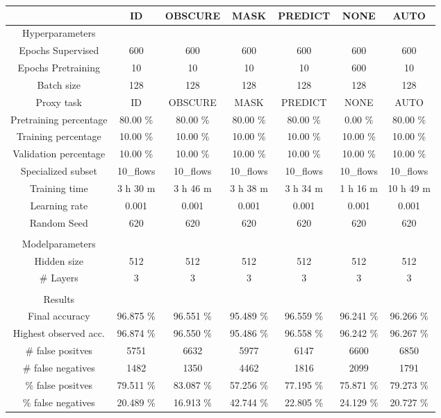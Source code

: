\begin{table}[htb]
    \centering
    \begin{tabular}{@{}ccccccc@{}}
        \toprule
         &  ID &  OBSCURE &  MASK &  PREDICT &  NONE &  AUTO \\
        \midrule
        Hyperparameters &  &  &  &  &  &  \\
        Epochs Supervised &  600 &  600 &  600 &  600 &  600 &  600 \\
        Epochs Pretraining &  10 &  10 &  10 &  10 &  600 &  10 \\
        Batch size &  128 &  128 &  128 &  128 &  128 &  128 \\
        Proxy task &  ID &  OBSCURE &  MASK &  PREDICT &  NONE &  AUTO \\
        Pretraining percentage &  80.00 \% &  80.00 \% &  80.00 \% &  80.00 \% &  0.00 \% &  80.00 \% \\
        Training percentage &  10.00 \% &  10.00 \% &  10.00 \% &  10.00 \% &  10.00 \% &  10.00 \% \\
        Validation percentage &  10.00 \% &  10.00 \% &  10.00 \% &  10.00 \% &  10.00 \% &  10.00 \% \\
        Specialized subset &  10\_flows &  10\_flows &  10\_flows &  10\_flows &  10\_flows &  10\_flows \\
        Training time &  3 h 30 m &  3 h 46 m &  3 h 38 m &  3 h 34 m &  1 h 16 m &  10 h 49 m \\
        Learning rate &  0.001 &  0.001 &  0.001 &  0.001 &  0.001 &  0.001 \\
        Random Seed &  620 &  620 &  620 &  620 &  620 &  620 \\
         \\
        Modelparameters &  &  &  &  &  &  \\
        Hidden size &  512 &  512 &  512 &  512 &  512 &  512 \\
        \# Layers &  3 &  3 &  3 &  3 &  3 &  3 \\
         \\
        Results &  &  &  &  &  &  \\
        Final accuracy &  96.875 \% &  96.551 \% &  95.489 \% &  96.559 \% &  96.241 \% &  96.266 \% \\
        Highest observed acc. &  96.874 \% &  96.550 \% &  95.486 \% &  96.558 \% &  96.242 \% &  96.267 \% \\
        \# false positves &  5751 &  6632 &  5977 &  6147 &  6600 &  6850 \\
        \# false negatives &  1482 &  1350 &  4462 &  1816 &  2099 &  1791 \\
        \% false positves &  79.511 \% &  83.087 \% &  57.256 \% &  77.195 \% &  75.871 \% &  79.273 \% \\
        \% false negatives &  20.489 \% &  16.913 \% &  42.744 \% &  22.805 \% &  24.129 \% &  20.727 \% \\
        \bottomrule
    \end{tabular}
\end{table}
